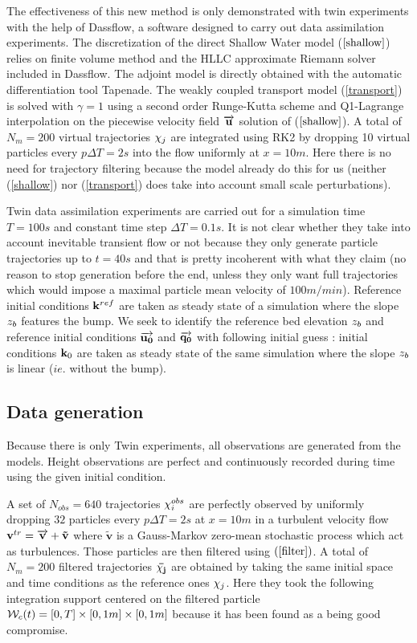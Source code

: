 The effectiveness of this new method is only demonstrated with twin experiments with the help of Dassflow,
a software designed to carry out data assimilation experiments.
The discretization of the direct Shallow Water model ($\ref{shallow}$) relies on finite volume method and the HLLC approximate Riemann solver included in Dassflow.
The adjoint model is directly obtained with the automatic differentiation tool Tapenade.
The weakly coupled transport model (\ref{transport}) is solved with $\gamma = 1$ using a second order Runge-Kutta scheme and Q1-Lagrange interpolation on the piecewise velocity field $\overrightarrow{\mathbf{u}}$ solution of ($\ref{shallow}$).
A total of $N_m = 200$ virtual trajectories $\mathbf{\chi}_j$ are integrated using RK2 by dropping 10 virtual particles every $p\Delta T = 2s$ into the flow uniformly at $x=10m$.
Here there is no need for trajectory filtering because the model already do this for us (neither (\ref{shallow}) nor (\ref{transport}) does take into account small scale perturbations).


\vskip 0.3cm
Twin data assimilation experiments are carried out for a simulation time $T = 100s$ and constant time step $\Delta T = 0.1s$. It is not clear whether they take into account inevitable transient flow or not because they only generate particle trajectories up to $t = 40s$ and that is pretty incoherent with what they claim (no reason to stop generation before the end, unless they only want full trajectories which would impose a maximal particle mean velocity of $100m/min$).
Reference initial conditions $\mathbf{k}^{ref}$ are taken as steady state of a simulation where the slope $z_b$ features the bump.
We seek to identify the reference bed elevation $z_b$ and reference initial conditions $\overrightarrow{\mathbf{u_0}}$ and $\overrightarrow{\mathbf{q_0}}$ with following initial guess :
initial conditions $\mathbf{k}_0$ are taken as steady state of the same simulation where the slope $z_b$ is linear ($ie.$ without the bump).

\subsection{Data generation}

Because there is only Twin experiments, all observations are generated from the models.
Height observations are perfect and continuously recorded during time using the given initial condition.

\vskip 0.3cm
A set of $N_{obs} = 640$ trajectories $\mathbf{\chi}_i^{obs}$ are perfectly observed by uniformly dropping $32$ particles every $p\Delta T = 2s$ at $x = 10m$ in a turbulent velocity flow $\mathbf{v}^{tr} = \overrightarrow{\mathbf{v}} + \mathbf{\tilde{v}}$ where $\mathbf{\tilde{v}}$ is a Gauss-Markov zero-mean stochastic process which act as turbulences. 
Those particles are then filtered using $(\ref{filter})$. A total of $N_m = 200$ filtered trajectories $\mathbf{\bar{\chi_j}}$ are obtained by taking the same initial space and time conditions as the reference ones $\mathbf{\chi}_j$. Here they took the following integration support centered on the filtered particle $\mathcal{W}_c(t) = [0,T] \times [0,1m] \times [0,1m]$ because it has been found as a being good compromise.


